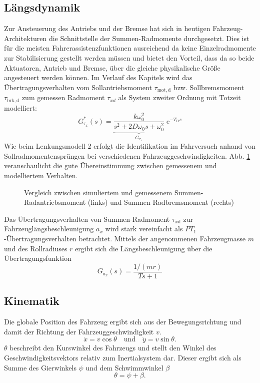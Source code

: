 \subsection{Längsdynamik}
Zur Ansteuerung des Antriebs und der Bremse hat sich in heutigen Fahrzeug-Architekturen die Schnittstelle der Summen-Radmomente durchgesetzt.  Dies ist für die meisten Fahrerassistenzfunktionen ausreichend da keine Einzelradmomente zur Stabilisierung gestellt werden müssen und bietet den Vorteil, dass da so beide Aktuatoren, Antrieb und Bremse,  über die gleiche physikalische Größe angesteuert werden können.  Im Verlauf des Kapitels wird das Übertragungsverhalten vom Sollantriebsmoment $\tau_\mathrm{mot,d}$ bzw. Sollbremsmoment $\tau_\mathrm{brk,d}$ zum gemessen Radmoment $\tau_{xd}$ als System zweiter Ordnung mit Totzeit modelliert:
\begin{equation}
G_{\tau_x}^*(s)=\underbrace{\frac{k\omega_0^2}{s^2+2D\omega_0 s + \omega_0^2}}_{\displaystyle{G_{\tau_x}}}\;\mathrm{e}^{-T_\mathrm{D}s}\label{eq:GLong}
\end{equation}
Wie beim Lenkungsmodell 2 erfolgt die Identifikation im Fahrversuch anhand von Sollradmomentensprüngen bei verschiedenen Fahrzeuggeschwindigkeiten.  Abb.  \ref{abb_ident_antrieb_bremse} veranschaulicht die gute Übereinstimmung zwischen gemessenem und modelliertem Verhalten.
   \begin{figure}[thpb]
      \centering
	\setlength\figureheight{7cm} 
	\setlength\figurewidth{10.5cm}
     
 \begin{center}
       \caption{Vergleich zwischen simuliertem und gemessenem Summen-Radantriebsmoment (links) und Summen-Radbremsmoment (rechts)}
      \label{abb_ident_antrieb_bremse}
       \end{center}
   \end{figure}    
Das Übertragungsverhalten von Summen-Radmoment $\tau_{x\mathrm{d}}$ zur Fahrzeuglängsbeschleunigung $a_x$ wird stark vereinfacht als $PT_1$-Übertragungsverhalten betrachtet. Mittels der angenommenen Fahrzeugmasse $m$ und des Rollradiuses $r$ ergibt sich die Längsbeschleunigung über die Übertragungsfunktion
\begin{equation}
G_{a_x}(s) = \frac{1/(mr)}{Ts+1} 
\label{eq:Gwhl}
\end{equation}
\subsection{Kinematik}
Die globale Position des Fahrzeug ergibt sich aus der Bewegungsrichtung und damit der Richtung der Fahrzeuggeschwindigkeit $v$.
\begin{equation}
\dot x = v \cos \theta \quad \mathrm{und} \quad \dot y = v \sin \theta.
\end{equation}
$\theta$ beschreibt den Kurswinkel des Fahrzeugs und stellt den Winkel des Geschwindigkeitsvektors relativ zum Inertialsystem dar. Dieser ergibt sich als Summe des Gierwinkels $\psi$ und dem Schwimmwinkel $\beta$
\begin{equation}
\theta = \psi + \beta.
\end{equation}



\FloatBarrier
